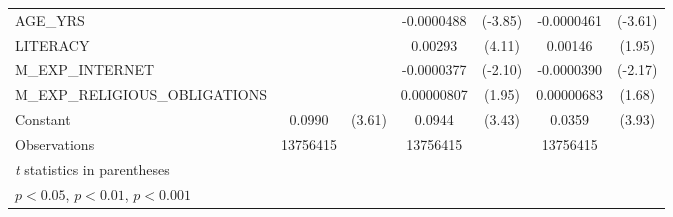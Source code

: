 {\begin{tabular}{l*{3}{cc}}
AGE\_YRS             &                     &            &  -0.0000488\sym{***}&     (-3.85)&  -0.0000461\sym{***}&     (-3.61)\\
LITERACY            &                     &            &     0.00293\sym{***}&      (4.11)&     0.00146         &      (1.95)\\
M\_EXP\_INTERNET      &                     &            &  -0.0000377\sym{*}  &     (-2.10)&  -0.0000390\sym{*}  &     (-2.17)\\
M\_EXP\_RELIGIOUS\_OBLIGATIONS&                     &            &  0.00000807         &      (1.95)&  0.00000683         &      (1.68)\\
Constant            &      0.0990\sym{***}&      (3.61)&      0.0944\sym{***}&      (3.43)&      0.0359\sym{***}&      (3.93)\\
\hline
Observations        &    13756415         &            &    13756415         &            &    13756415         &            \\
\hline\hline
\multicolumn{7}{l}{\footnotesize \textit{t} statistics in parentheses}\\
\multicolumn{7}{l}{\footnotesize \sym{*} \(p<0.05\), \sym{**} \(p<0.01\), \sym{***} \(p<0.001\)}\\
\end{tabular}
}
